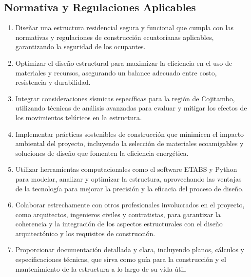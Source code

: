 \documentclass{article}
\begin{document}
\subsection{Normativa y Regulaciones Aplicables}
\begin{enumerate}
    \item  Diseñar una estructura residencial segura y funcional que cumpla con las normativas y regulaciones de construcción ecuatorianas aplicables, garantizando la seguridad de los ocupantes.

    \item Optimizar el diseño estructural para maximizar la eficiencia en el uso de materiales y recursos, asegurando un balance adecuado entre costo, resistencia y durabilidad.

    \item Integrar consideraciones sísmicas específicas para la región de Cojitambo, utilizando técnicas de análisis avanzadas para evaluar y mitigar los efectos de los movimientos telúricos en la estructura.

    \item Implementar prácticas sostenibles de construcción que minimicen el impacto ambiental del proyecto, incluyendo la selección de materiales ecoamigables y soluciones de diseño que fomenten la eficiencia energética.

    \item Utilizar herramientas computacionales como el software ETABS y Python para modelar, analizar y optimizar la estructura, aprovechando las ventajas de la tecnología para mejorar la precisión y la eficacia del proceso de diseño.

    \item Colaborar estrechamente con otros profesionales involucrados en el proyecto, como arquitectos, ingenieros civiles y contratistas, para garantizar la coherencia y la integración de los aspectos estructurales con el diseño arquitectónico y los requisitos de construcción.

    \item Proporcionar documentación detallada y clara, incluyendo planos, cálculos y especificaciones técnicas, que sirva como guía para la construcción y el mantenimiento de la estructura a lo largo de su vida útil.
\end{enumerate}
\end{document}
